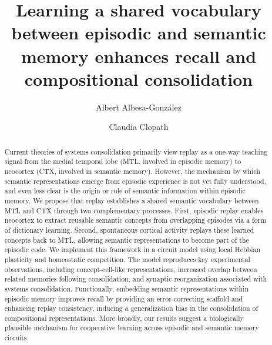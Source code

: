 \documentclass{article}
\title{Learning a shared vocabulary between episodic and semantic memory enhances recall and compositional consolidation}
\author[1]{Albert Albesa-González}
\author[1]{Claudia Clopath}
\affil[1]{Department of Bioengineering, Imperial College London, London, UK}
\begin{document}
\maketitle
\begin{abstract}
\noindent Current theories of systems consolidation primarily view replay as a one-way teaching signal from the medial temporal lobe (MTL, involved in episodic memory) to neocortex (CTX, involved in semantic memory). However, the mechanism by which semantic representations emerge from episodic experience is not yet fully understood, and even less clear is the origin or role of semantic information within episodic memory. We propose that replay establishes a shared semantic vocabulary between MTL and CTX through two complementary processes. First, episodic replay enables neocortex to extract reusable semantic concepts from overlapping episodes via a form of dictionary learning. Second, spontaneous cortical activity replays these learned concepts back to MTL, allowing semantic representations to become part of the episodic code. We implement this framework in a circuit model using local Hebbian plasticity and homeostatic competition. The model reproduces key experimental observations, including concept-cell-like representations, increased overlap between related memories following consolidation, and synaptic reorganization associated with systems consolidation. Functionally, embedding semantic representations within episodic memory improves recall by providing an error-correcting scaffold and enhancing replay consistency, inducing a generalization bias in the consolidation of compositional representations. More broadly, our results suggest a biologically plausible mechanism for cooperative learning across episodic and semantic memory circuits.
\end{abstract}
\end{document}

